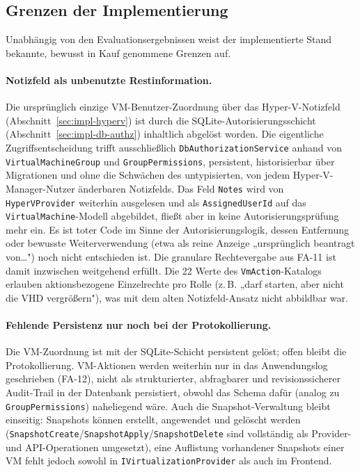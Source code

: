 \documentclass[12pt,a4paper]{article}
\begin{document}
\subsection{Grenzen der Implementierung}
\label{sec:grenzen}

Unabhängig von den Evaluationsergebnissen weist der implementierte Stand bekannte, bewusst in Kauf genommene Grenzen auf.

\paragraph{Notizfeld als unbenutzte Restinformation.} Die ursprünglich einzige VM-Benutzer-Zuordnung über das Hyper-V-Notizfeld (Abschnitt~\ref{sec:impl-hyperv}) ist durch die SQLite-Autorisierungsschicht (Abschnitt~\ref{sec:impl-db-authz}) inhaltlich abgelöst worden. Die eigentliche Zugriffsentscheidung trifft ausschließlich \texttt{DbAuthorizationService} anhand von \texttt{VirtualMachineGroup} und \texttt{GroupPermissions}, persistent, historisierbar über Migrationen und ohne die Schwächen des untypisierten, von jedem Hyper-V-Manager-Nutzer änderbaren Notizfelds. Das Feld \texttt{Notes} wird von \texttt{HyperVProvider} weiterhin ausgelesen und als \texttt{AssignedUserId} auf das \texttt{VirtualMachine}-Modell abgebildet, fließt aber in keine Autorisierungsprüfung mehr ein. Es ist toter Code im Sinne der Autorisierungslogik, dessen Entfernung oder bewusste Weiterverwendung (etwa als reine Anzeige „ursprünglich beantragt von…") noch nicht entschieden ist. Die granulare Rechtevergabe aus FA-11 ist damit inzwischen weitgehend erfüllt. Die 22 Werte des \texttt{VmAction}-Katalogs erlauben aktionsbezogene Einzelrechte pro Rolle (z.\,B. „darf starten, aber nicht die VHD vergrößern"), was mit dem alten Notizfeld-Ansatz nicht abbildbar war.

\paragraph{Fehlende Persistenz nur noch bei der Protokollierung.} Die VM-Zuordnung ist mit der SQLite-Schicht persistent gelöst; offen bleibt die Protokollierung. VM-Aktionen werden weiterhin nur in das Anwendungslog geschrieben (FA-12), nicht als strukturierter, abfragbarer und revisionssicherer Audit-Trail in der Datenbank persistiert, obwohl das Schema dafür (analog zu \texttt{GroupPermissions}) naheliegend wäre. Auch die Snapshot-Verwaltung bleibt einseitig: Snapshots können erstellt, angewendet und gelöscht werden (\texttt{SnapshotCreate}/\texttt{SnapshotApply}/\texttt{SnapshotDelete} sind vollständig als Provider- und API-Operationen umgesetzt), eine Auflistung vorhandener Snapshots einer VM fehlt jedoch sowohl in \texttt{IVirtualizationProvider} als auch im Frontend.
\end{document}

